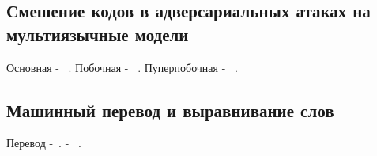 
\subsection{Смешение кодов в адверсариальных атаках на мультиязычные модели}
Основная - ~\cite{Tan2021CodeMixingOS}.
Побочная - ~\cite{Krishnan2021MultilingualCF}.
Пуперпобочная - ~\cite{santy-etal-2021-bertologicomix}.


\subsection{Машинный перевод и выравнивание слов}
Перевод -~\cite{Fan2020BeyondEM}.
 - ~\cite{Dou2021WordAB}.

